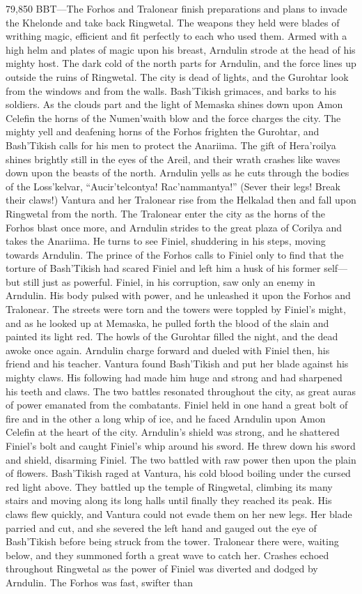 \documentclass[smalldemyvopaper,11pt,twoside,onecolumn,openright,extrafontsizes]{memoir}
\begin{document}
79,850 BBT—The Forhos and Tralonear finish preparations and plans to invade the Khelonde and take back Ringwetal. The weapons they held were blades of writhing magic, efficient and fit perfectly to each who used them. Armed with a high helm and plates of magic upon his breast, Arndulin strode at the head of his mighty host. The dark cold of the north parts for Arndulin, and the force lines up outside the ruins of Ringwetal. The city is dead of lights, and the Gurohtar look from the windows and from the walls. Bash’Tikish grimaces, and barks to his soldiers. As the clouds part and the light of Memaska shines down upon Amon Celefin the horns of the Numen’waith blow and the force charges the city. The mighty yell and deafening horns of the Forhos frighten the Gurohtar, and Bash’Tikish calls for his men to protect the Anariima. The gift of Hera’roilya shines brightly still in the eyes of the Areil, and their wrath crashes like waves down upon the beasts of the north.  Arndulin yells as he cuts through the bodies of the Loss’kelvar, “Aucir’telcontya! Rac’nammantya!” (Sever their legs! Break their claws!) Vantura and her Tralonear rise from the Helkalad then and fall upon Ringwetal from the north. The Tralonear enter the city as the horns of the Forhos blast once more, and Arndulin strides to the great plaza of Corilya and takes the Anariima. He turns to see Finiel, shuddering in his steps, moving towards Arndulin. The prince of the Forhos calls to Finiel only to find that the torture of Bash’Tikish had scared Finiel and left him a husk of his former self—but still just as powerful. Finiel, in his corruption, saw only an enemy in Arndulin. His body pulsed with power, and he unleashed it upon the Forhos and Tralonear. The streets were torn and the towers were toppled by Finiel’s might, and as he looked up at Memaska, he pulled forth the blood of the slain and painted its light red. The howls of the Gurohtar filled the night, and the dead awoke once again. Arndulin charge forward and dueled with Finiel then, his friend and his teacher. Vantura found Bash’Tikish and put her blade against his mighty claws. His following had made him huge and strong and had sharpened his teeth and claws. The two battles resonated throughout the city, as great auras of power emanated from the combatants. Finiel held in one hand a great bolt of fire and in the other a long whip of ice, and he faced Arndulin upon Amon Celefin at the heart of the city. Arndulin’s shield was strong, and he shattered Finiel’s bolt and caught Finiel’s whip around his sword. He threw down his sword and shield, disarming Finiel. The two battled with raw power then upon the plain of flowers. Bash’Tikish raged at Vantura, his cold blood boiling under the cursed red light above. They battled up the temple of Ringwetal, climbing its many stairs and moving along its long halls until finally they reached its peak. His claws flew quickly, and Vantura could not evade them on her new legs. Her blade parried and cut, and she severed the left hand and gauged out the eye of Bash’Tikish before being struck from the tower. Tralonear there were, waiting below, and they summoned forth a great wave to catch her. Crashes echoed throughout Ringwetal as the power of Finiel was diverted and dodged by Arndulin. The Forhos was fast, swifter than 
\end{document}
